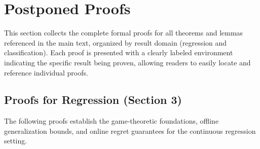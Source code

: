 \section{Postponed Proofs}
\label{sec:postponed_proofs}

This section collects the complete formal proofs for all theorems and lemmas referenced in the main text, organized by result domain (regression and classification). Each proof is presented with a clearly labeled environment indicating the specific result being proven, allowing readers to easily locate and reference individual proofs.

\subsection{Proofs for Regression (Section 3)}
\label{subsec:proofs_regression}

The following proofs establish the game-theoretic foundations, offline generalization bounds, and online regret guarantees for the continuous regression setting.

